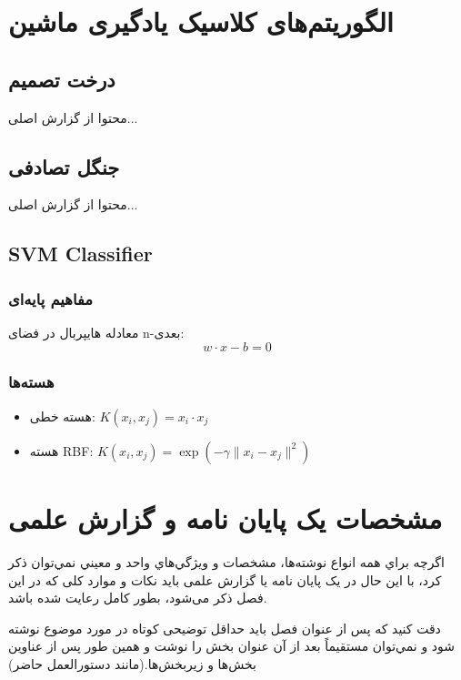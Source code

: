 \chapter{الگوریتم‌های کلاسیک یادگیری ماشین}
\label{chap:ml-algorithms}

\section{درخت تصمیم}
\label{sec:decision-tree}
محتوا از گزارش اصلی...

\section{جنگل تصادفی}
\label{sec:random-forest}
محتوا از گزارش اصلی...

\section{SVM Classifier}
\label{sec:svm}
\subsection{مفاهیم پایه‌ای}
معادله هایپربال در فضای n-بعدی:
\begin{equation}
w \cdot x - b = 0
\end{equation}

\subsection{هسته‌ها}
\begin{itemize}
\item هسته خطی: $K(x_i, x_j) = x_i \cdot x_j$
\item هسته RBF: $K(x_i, x_j) = \exp(-\gamma \|x_i - x_j\|^2)$
\end{itemize}

\chapter{مشخصات یک پایان نامه و گزارش علمی}

اگرچه براي همه انواع نوشته‌ها، مشخصات و ويژگي‌هاي واحد و معيني نمي‌توان ذكر كرد، با اين حال در یک پایان نامه یا گزارش علمی باید نکات و موارد کلی که در این فصل ذکر می‌شود، بطور کامل رعایت شده باشد. 

دقت كنيد كه پس از عنوان فصل بايد حداقل توضیحی کوتاه در مورد موضوع نوشته شود و نمي‌توان مستقيماً بعد از آن عنوان بخش را نوشت و همين طور پس از عناوين بخش‌ها و زيربخش‌ها.(مانند دستورالعمل حاضر)
